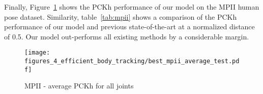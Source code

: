 Finally, Figure~\ref{fig:mpi_results} shows the PCKh performance of our model on the MPII human pose dataset. Similarity, table~\ref{tab:mpii} shows a comparison of the PCKh performance of our model and previous state-of-the-art at a normalized distance of 0.5.  Our model out-performs all existing methods by a considerable margin.

\begin{figure}[ht]
\centering
\texttt{[image: figures\_4\_efficient\_body\_tracking/best\_mpii\_average\_test.pdf]}
   \caption{MPII - average PCKh for all joints}
\label{fig:mpi_results}
\end{figure}

\begin{table}[ht]
\centering
\begin{small} %
\end{small}
\caption{Comparison with prior-art: MPII (PCKh @ 0.5)}
\label{tab:mpii}
\end{table}
